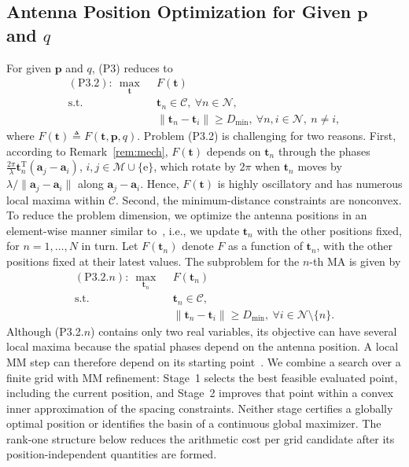 \documentclass[journal]{IEEEtran}
\newcommand{\bt}{\mathbf{t}}
\newcommand{\bp}{\mathbf{p}}
\newcommand{\ba}{\mathbf{a}}
\newcommand{\Dmin}{D_{\mathrm{min}}}
\begin{document}
\subsection{Antenna Position Optimization for Given $\bp$ and $q$}\label{sec:position}

For given $\bp$ and $q$, (P3) reduces to
\begin{subequations}\label{eq:P32}
\begin{align}
(\mathrm{P3.2}):\ \max_{\bt}\ \ & F(\bt)\\
\mathrm{s.t.}\ \ & \bt_n\in\mathcal C,\ \forall n\in\mathcal N,\\
& \|\bt_n-\bt_i\|\ge\Dmin,\ \forall n,i\in\mathcal N,\ n\neq i,
\end{align}
\end{subequations}
where $F(\bt)\triangleq F(\bt,\bp,q)$. Problem (P3.2) is challenging for two reasons. First, according to Remark~\ref{rem:mech}, $F(\bt)$ depends on $\bt_n$ through the phases $\frac{2\pi}{\lambda}\bt_n^{\mathrm{T}}(\ba_j-\ba_i)$, $i,j\in\mathcal M\cup\{\mathrm{e}\}$, which rotate by $2\pi$ when $\bt_n$ moves by $\lambda/\|\ba_j-\ba_i\|$ along $\ba_j-\ba_i$. Hence, $F(\bt)$ is highly oscillatory and has numerous local maxima within $\mathcal C$. Second, the minimum-distance constraints are nonconvex. To reduce the problem dimension, we optimize the antenna positions in an element-wise manner similar to~\cite{ZhengTCOM2025}, i.e., we update $\bt_n$ with the other positions fixed, for $n=1,\ldots,N$ in turn. Let $F(\bt_n)$ denote $F$ as a function of $\bt_n$, with the other positions fixed at their latest values. The subproblem for the $n$-th MA is given by
\begin{subequations}\label{eq:P32n0}
\begin{align}
(\mathrm{P3.2}.n):\ \max_{\bt_n}\ \ & F(\bt_n)\\
\mathrm{s.t.}\ \ & \bt_n\in\mathcal C,\\
& \|\bt_n-\bt_i\|\ge\Dmin,\ \forall i\in\mathcal N\setminus\{n\}.
\end{align}
\end{subequations}
Although (P3.2.$n$) contains only two real variables, its objective can have several local maxima because the spatial phases depend on the antenna position. A local MM step can therefore depend on its starting point~\cite{ZhengTCOM2025}. We combine a search over a finite grid with MM refinement: Stage~1 selects the best feasible evaluated point, including the current position, and Stage~2 improves that point within a convex inner approximation of the spacing constraints. Neither stage certifies a globally optimal position or identifies the basin of a continuous global maximizer. The rank-one structure below reduces the arithmetic cost per grid candidate after its position-independent quantities are formed.
\end{document}
